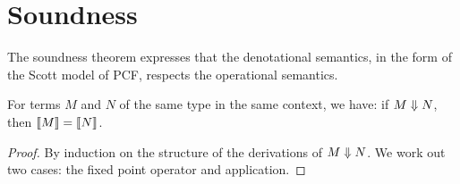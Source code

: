 \chapter{Soundness}\label{chap:soundness}

The soundness theorem expresses that the denotational semantics, in the form of
the Scott model of PCF, respects the operational semantics.

\begin{theorem}[Soundness]\label{soundness}
  For terms \(M\) and \(N\) of the same type in the same context, we have: if
  \(M \Downarrow N\), then \(\llbracket M\rrbracket = \llbracket N\rrbracket\).
\end{theorem}
\begin{proof}
  By induction on the structure of the derivations of \(M \Downarrow N\).
  We work out two cases: the fixed point operator and application.


\end{proof}
